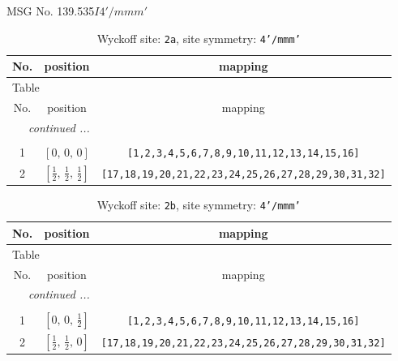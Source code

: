 \documentclass[fleqn,8pt]{jsarticle}
\begin{document}
\setcounter{MaxMatrixCols}{32}

\renewcommand{\tablename}{Table~}
\renewcommand{\figurename}{Figure~}
\begin{center}
\LARGE
MSG No. 139.535\quad$I4'/mmm'$
\end{center}
\renewcommand{\arraystretch}{1.2}
\begin{longtable}{ccc}
\caption{Wyckoff site: {\tt 2a}, site symmetry: {\tt 4'/mmm'}}
 \\
 \hline \hline
No. & position & mapping \\ \hline \endfirsthead

\multicolumn{2}{l}{\tablename\ \thetable{}} \\
 \hline \hline
No. & position & mapping \\ \hline \endhead

 \hline \hline
\multicolumn{2}{r}{\footnotesize\it continued ...} \\ \endfoot

 \hline \hline
\multicolumn{2}{r}{} \\ \endlastfoot

1 & $\left[ 0,\, 0,\, 0 \right]$ & {\tt [1,2,3,4,5,6,7,8,9,10,11,12,13,14,15,16]} \\ \hline
2 & $\left[ \frac{1}{2},\, \frac{1}{2},\, \frac{1}{2} \right]$ & {\tt [17,18,19,20,21,22,23,24,25,26,27,28,29,30,31,32]} \\
\end{longtable}
\renewcommand{\arraystretch}{1.2}
\begin{longtable}{ccc}
\caption{Wyckoff site: {\tt 2b}, site symmetry: {\tt 4'/mmm'}}
 \\
 \hline \hline
No. & position & mapping \\ \hline \endfirsthead

\multicolumn{2}{l}{\tablename\ \thetable{}} \\
 \hline \hline
No. & position & mapping \\ \hline \endhead

 \hline \hline
\multicolumn{2}{r}{\footnotesize\it continued ...} \\ \endfoot

 \hline \hline
\multicolumn{2}{r}{} \\ \endlastfoot

1 & $\left[ 0,\, 0,\, \frac{1}{2} \right]$ & {\tt [1,2,3,4,5,6,7,8,9,10,11,12,13,14,15,16]} \\ \hline
2 & $\left[ \frac{1}{2},\, \frac{1}{2},\, 0 \right]$ & {\tt [17,18,19,20,21,22,23,24,25,26,27,28,29,30,31,32]} \\
\end{longtable}
\end{document}
